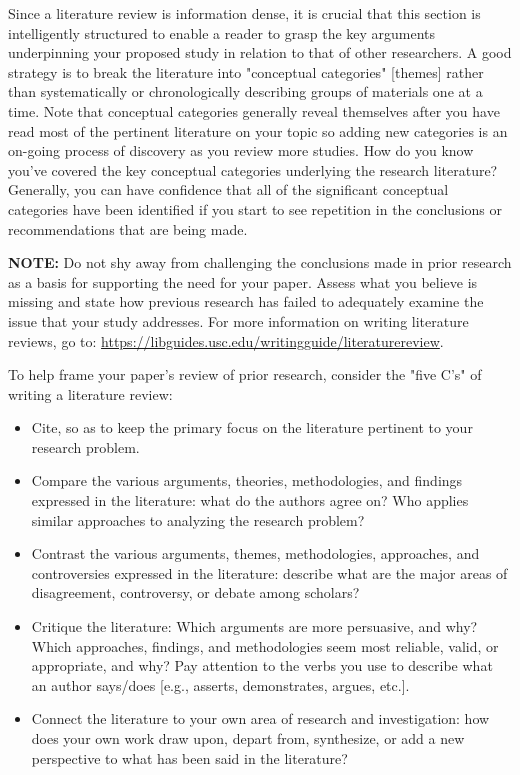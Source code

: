 \documentclass[10pt,twocolumn,letterpaper]{article}
\begin{document}
Since a literature review is information dense, it is crucial that this section is intelligently structured to enable a reader to grasp the key arguments underpinning your proposed study in relation to that of other researchers. A good strategy is to break the literature into "conceptual categories" [themes] rather than systematically or chronologically describing groups of materials one at a time. Note that conceptual categories generally reveal themselves after you have read most of the pertinent literature on your topic so adding new categories is an on-going process of discovery as you review more studies. How do you know you've covered the key conceptual categories underlying the research literature? Generally, you can have confidence that all of the significant conceptual categories have been identified if you start to see repetition in the conclusions or recommendations that are being made.

\textbf{NOTE:} Do not shy away from challenging the conclusions made in prior research as a basis for supporting the need for your paper. Assess what you believe is missing and state how previous research has failed to adequately examine the issue that your study addresses. For more information on writing literature reviews, go to: \url{https://libguides.usc.edu/writingguide/literaturereview}.

To help frame your paper's review of prior research, consider the "five C’s" of writing a literature review:
\begin{itemize}
    \item Cite, so as to keep the primary focus on the literature pertinent to your research problem.
    \item Compare the various arguments, theories, methodologies, and findings expressed in the literature: what do the authors agree on? Who applies similar approaches to analyzing the research problem?
    \item Contrast the various arguments, themes, methodologies, approaches, and controversies expressed in the literature: describe what are the major areas of disagreement, controversy, or debate among scholars?
    \item Critique the literature: Which arguments are more persuasive, and why? Which approaches, findings, and methodologies seem most reliable, valid, or appropriate, and why? Pay attention to the verbs you use to describe what an author says/does [e.g., asserts, demonstrates, argues, etc.].
    \item Connect the literature to your own area of research and investigation: how does your own work draw upon, depart from, synthesize, or add a new perspective to what has been said in the literature?
\end{itemize}
\end{document}

